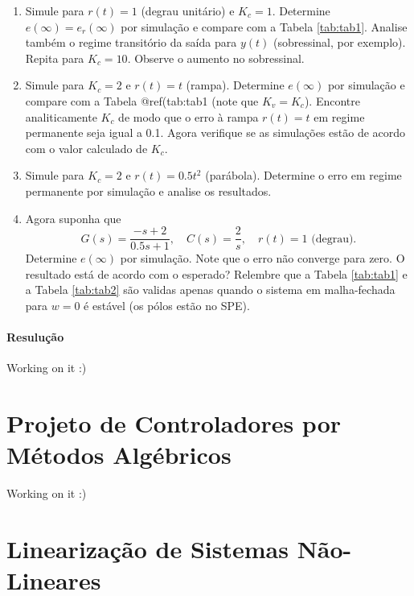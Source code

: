 \documentclass[
]{book}
\providecommand{\tightlist}{%
  \setlength{\itemsep}{0pt}\setlength{\parskip}{0pt}}
\begin{document}
\begin{enumerate}
\def\labelenumi{\alph{enumi}.}
\tightlist
\item
  Simule para \(r(t) = 1\) (degrau unitário) e \(K_c = 1\). Determine \(e(\infty) = e_r(\infty)\) por simulação e compare com a Tabela \ref{tab:tab1}. Analise também o regime transitório da saída para \(y(t)\) (sobressinal, por exemplo). Repita para \(K_c = 10\). Observe o aumento no sobressinal.
\item
  Simule para \(K_c = 2\) e \(r(t) = t\) (rampa). Determine \(e(\infty)\) por simulação e compare com a Tabela @ref(tab:tab1 (note que \(K_v = K_c\)). Encontre analiticamente \(K_c\) de modo que o erro à rampa \(r(t) = t\) em regime permanente seja igual a 0.1. Agora verifique se as simulações estão de acordo com o valor calculado de \(K_c\).
\item
  Simule para \(K_c = 2\) e \(r(t) = 0.5t^2\) (parábola). Determine o erro em regime permanente por simulação e analise os resultados.
\item
  Agora suponha que
  \[
  G(s) = \frac {-s+2}{0.5s+1}, \quad C(s)= \frac{2}{s}, \quad r(t) = 1 \text{ (degrau).}
  \]
  Determine \(e(\infty)\) por simulação. Note que o erro não converge para zero. O resultado está de acordo com o esperado? Relembre que a Tabela \ref{tab:tab1} e a Tabela \ref{tab:tab2} são validas apenas quando o sistema em malha-fechada para \(w=0\) é estável (os pólos estão no SPE).
\end{enumerate}

\hypertarget{resuluuxe7uxe3o}{%
\subsubsection*{Resulução}\label{resuluuxe7uxe3o}}

Working on it :)

\hypertarget{projeto-de-controladores-por-muxe9todos-alguxe9bricos}{%
\chapter{Projeto de Controladores por Métodos Algébricos}\label{projeto-de-controladores-por-muxe9todos-alguxe9bricos}}

Working on it :)

\hypertarget{linearizauxe7uxe3o-de-sistemas-nuxe3o-lineares}{%
\chapter{Linearização de Sistemas Não-Lineares}\label{linearizauxe7uxe3o-de-sistemas-nuxe3o-lineares}}
\end{document}
